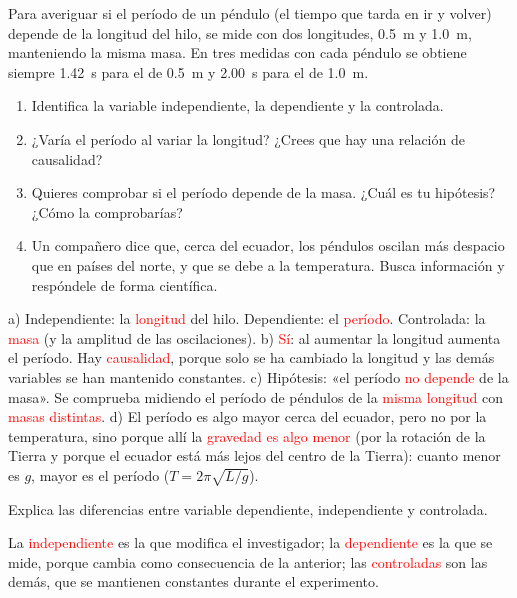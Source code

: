 \begin{exercise}
    Para averiguar si el período de un péndulo (el tiempo que tarda en ir y volver) depende de la longitud del hilo, se mide con dos longitudes, \qty{0.5}{\m} y \qty{1.0}{\m}, manteniendo la misma masa. En tres medidas con cada péndulo se obtiene siempre \qty{1.42}{\s} para el de \qty{0.5}{\m} y \qty{2.00}{\s} para el de \qty{1.0}{\m}.
    \begin{enumerate}[label=\alph*)]
        \item Identifica la variable independiente, la dependiente y la controlada.
        \item ¿Varía el período al variar la longitud? ¿Crees que hay una relación de causalidad?
        \item Quieres comprobar si el período depende de la masa. ¿Cuál es tu hipótesis? ¿Cómo la comprobarías?
        \item Un compañero dice que, cerca del ecuador, los péndulos oscilan más despacio que en países del norte, y que se debe a la temperatura. Busca información y respóndele de forma científica.
    \end{enumerate}
    \begin{solu}
        a) Independiente: la \textcolor{red}{longitud} del hilo. Dependiente: el \textcolor{red}{período}. Controlada: la \textcolor{red}{masa} (y la amplitud de las oscilaciones).
        b) \textcolor{red}{Sí}: al aumentar la longitud aumenta el período. Hay \textcolor{red}{causalidad}, porque solo se ha cambiado la longitud y las demás variables se han mantenido constantes.
        c) Hipótesis: «el período \textcolor{red}{no depende} de la masa». Se comprueba midiendo el período de péndulos de la \textcolor{red}{misma longitud} con \textcolor{red}{masas distintas}.
        d) El período es algo mayor cerca del ecuador, pero no por la temperatura, sino porque allí la \textcolor{red}{gravedad es algo menor} (por la rotación de la Tierra y porque el ecuador está más lejos del centro de la Tierra): cuanto menor es \(g\), mayor es el período (\(T = 2\pi\sqrt{L/g}\)).
    \end{solu}
\end{exercise}

\begin{exercise}
    Explica las diferencias entre variable dependiente, independiente y controlada.
    \begin{solu}
        La \textcolor{red}{independiente} es la que modifica el investigador; la \textcolor{red}{dependiente} es la que se mide, porque cambia como consecuencia de la anterior; las \textcolor{red}{controladas} son las demás, que se mantienen constantes durante el experimento.
    \end{solu}
\end{exercise}

